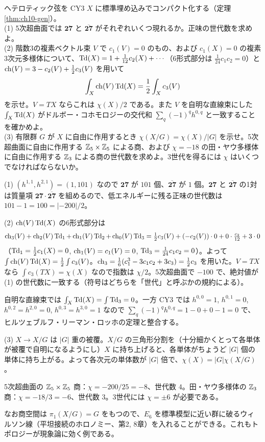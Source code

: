 \begin{problem}[難易度 B]\label{ch10-prob-gen}
ヘテロティック弦を CY3 $X$ に標準埋め込みでコンパクト化する（定理 \ref{thm:ch10-gen}）。\\
(1) 5次超曲面では $\mathbf{27}$ と $\overline{\mathbf{27}}$ がそれぞれいくつ現れるか。正味の世代数を求めよ。\\
(2) 階数3の複素ベクトル束 $V$ で $c_1(V)=0$ のもの、および $c_1(X)=0$ の複素3次元多様体について、$\operatorname{Td}(X)=1+\frac{1}{12}c_2(X)+\cdots$（6形式部分は $\frac{1}{24}c_1c_2=0$）と $\operatorname{ch}(V)=3-c_2(V)+\frac12c_3(V)$ を用いて
\[
\int_X\operatorname{ch}(V)\operatorname{Td}(X)=\frac12\int_Xc_3(V)
\]
を示せ。$V=TX$ ならこれは $\chi(X)/2$ である。また $V$ を自明な直線束にした $\int_X\operatorname{Td}(X)$ がドルボー・コホモロジーの交代和 $\sum_q(-1)^qh^{0,q}$ と一致することを確かめよ。\\
(3) 有限群 $G$ が $X$ に自由に作用するとき $\chi(X/G)=\chi(X)/\lvert G\rvert$ を示せ。5次超曲面に自由に作用する $\mathbb{Z}_5\times\mathbb{Z}_5$ による商、および $\chi=-18$ の田・ヤウ多様体に自由に作用する $\mathbb{Z}_3$ による商の世代数を求めよ。3世代を得るには $\chi$ はいくつでなければならないか。
\end{problem}

\begin{solution}
(1) $(h^{1,1},h^{2,1})=(1,101)$ なので $\mathbf{27}$ が $101$ 個、$\overline{\mathbf{27}}$ が $1$ 個。$\mathbf{27}$ と $\overline{\mathbf{27}}$ の1対は質量項 $\mathbf{27}\cdot\overline{\mathbf{27}}$ を組めるので、低エネルギーに残る正味の世代数は $101-1=100=\lvert-200\rvert/2$。

(2) $\operatorname{ch}(V)\operatorname{Td}(X)$ の6形式部分は
\[
\operatorname{ch}_3(V)+\operatorname{ch}_2(V)\operatorname{Td}_1+\operatorname{ch}_1(V)\operatorname{Td}_2+\operatorname{ch}_0(V)\operatorname{Td}_3=\tfrac12c_3(V)+(-c_2(V))\cdot0+0\cdot\tfrac{c_2}{12}+3\cdot0
\]
（$\operatorname{Td}_1=\frac12c_1(X)=0$, $\operatorname{ch}_1(V)=c_1(V)=0$, $\operatorname{Td}_3=\frac1{24}c_1c_2=0$）。よって $\int\operatorname{ch}(V)\operatorname{Td}(X)=\frac12\int c_3(V)$。$\operatorname{ch}_3=\frac16(c_1^3-3c_1c_2+3c_3)=\frac12c_3$ を用いた。$V=TX$ なら $\int c_3(TX)=\chi(X)$ なので指数は $\chi/2$。5次超曲面で $-100$ で、絶対値が (1) の世代数に一致する（符号はどちらを「世代」と呼ぶかの規約による）。

自明な直線束では $\int_X\operatorname{Td}(X)=\int\operatorname{Td}_3=0$。一方 CY3 では $h^{0,0}=1$, $h^{0,1}=0$, $h^{0,2}=h^{2,0}=0$, $h^{0,3}=h^{3,0}=1$ なので $\sum_q(-1)^qh^{0,q}=1-0+0-1=0$ で、ヒルツェブルフ・リーマン・ロッホの定理と整合する。

(3) $X\to X/G$ は $\lvert G\rvert$ 重の被覆。$X/G$ の三角形分割を（十分細かくとって各単体が被覆で自明になるようにし）$X$ に持ち上げると、各単体がちょうど $\lvert G\rvert$ 個の単体に持ち上がる。よって各次元の単体数が $\lvert G\rvert$ 倍で、$\chi(X)=\lvert G\rvert\chi(X/G)$。

5次超曲面の $\mathbb{Z}_5\times\mathbb{Z}_5$ 商：$\chi=-200/25=-8$、世代数 $4$。田・ヤウ多様体の $\mathbb{Z}_3$ 商：$\chi=-18/3=-6$、世代数 $3$。3世代には $\chi=\pm6$ が必要である。

なお商空間は $\pi_1(X/G)=G$ をもつので、$E_6$ を標準模型に近い群に破るウィルソン線（平坦接続のホロノミー、第2, 8章）を入れることができる。これもトポロジーが現象論に効く例である。
\end{solution}

